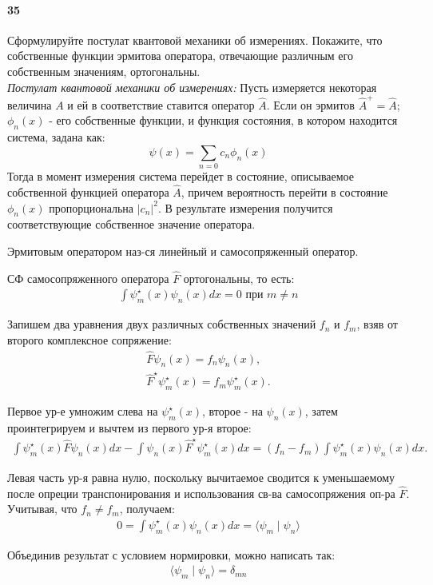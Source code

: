 


\paragraph{35}
Сформулируйте постулат квантовой механики об измерениях. Покажите, что собственные функции эрмитова оператора, отвечающие различным его собственным значениям, ортогональны.
\\

\textit{Постулат квантовой механики об измерениях:}
Пусть измеряется некоторая величина $A$ и ей в соответствие ставится оператор $\hat{A}$. Если он эрмитов ${\hat{A}^+=\hat{A}}$; $\phi_n(x)$ - его собственные функции, и функция состояния, в котором находится система, задана как:
$$\psi(x)=\sum_{n=0}c_n\phi_n(x)$$
Тогда в момент измерения система перейдет в состояние, описываемое собственной функцией оператора $\hat{A}$, причем вероятность перейти в состояние $\phi_n(x)$ пропорциональна ${\left|c_n\right|}^2$. В результате измерения получится соответствующие собственное значение оператора.

	\begin{definition}
		Эрмитовым оператором наз-ся линейный и самосопряженный оператор.
	\end{definition}
	
	СФ самосопряженного оператора $\hat F$ ортогональны, то есть:
	\begin{gather*}
	\int \psi^{\star}_m(x) \psi_n(x)dx = 0\text{ при }m\ne n
	\end{gather*}
	
	Запишем два уравнения двух различных собственных значений $f_n$ и $f_m$, взяв от второго комплексное сопряжение:
	\begin{gather*}
	\hat{F}\psi_n(x)=f_n\psi_n(x),\\
	\hat{F}^\star \psi^\star_m(x)=f_m\psi^\star_m(x).
	\end{gather*}
	
	Первое ур-е умножим слева на $\psi^\star_m(x)$, второе - на $\psi_n(x)$, затем проинтегрируем и вычтем из первого ур-я второе:
	\begin{gather*}
	\int \psi^\star_m(x)\hat{F}\psi_n(x)dx - 
	\int \psi_n(x)\hat{F}^\star \psi^\star_m(x)dx=
	(f_n-f_m)\int \psi^\star_m(x)\psi_n(x)dx.
	\end{gather*}
	
	Левая часть ур-я равна нулю, поскольку вычитаемое сводится к уменьшаемому после опреции транспонирования и использования св-ва самосопряжения оп-ра $\hat{F}$. Учитывая, что $f_n\ne f_m$, получаем:
	\begin{gather*}
	0=\int \psi^\star_m(x)\psi_n(x)dx=
	\langle\psi_m\mid\psi_n\rangle
	\end{gather*}
	
	Объединив результат с условием нормировки, можно написать так:
	\begin{gather*}
	\langle\psi_m\mid\psi_n\rangle=\delta_{mn}
	\end{gather*}

